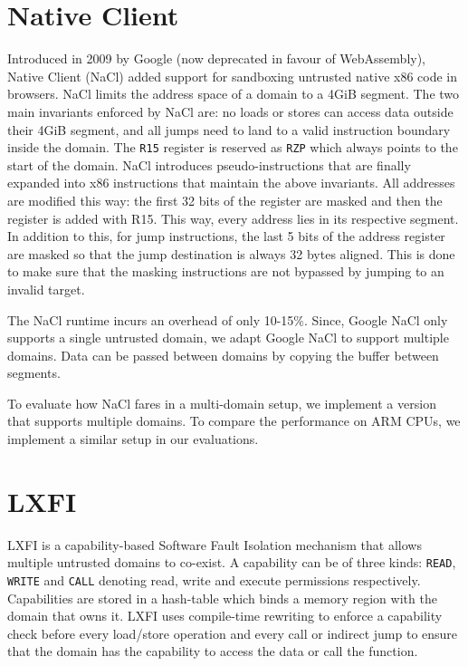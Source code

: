\section{Native Client}
Introduced in 2009 by Google (now deprecated in favour of WebAssembly), Native Client (NaCl) \cite{nacl} added support for sandboxing untrusted native x86 code in browsers. NaCl limits the address space of a domain to a 4GiB segment. The two main invariants enforced by NaCl are:  no loads or stores can access data outside their 4GiB segment, and all jumps need to land to a valid instruction boundary inside the domain. The \lstinline{R15} register is reserved as \lstinline{RZP} which always points to the start of the domain. NaCl introduces pseudo-instructions that are finally expanded into x86 instructions that maintain the above invariants. 
All addresses are modified this way: the first 32 bits of the register are masked and then the register is added with R15. This way, every address lies in its respective segment. In addition to this, for jump instructions, the last 5 bits of the address register are masked so that the jump destination is always 32 bytes aligned. This is done to make sure that the masking instructions are not bypassed by jumping to an invalid target. 

The NaCl runtime incurs an overhead of only 10-15\%. Since, Google NaCl only supports a single untrusted domain, we adapt Google NaCl to support multiple domains. Data can be passed between domains by copying the buffer between segments. 

To evaluate how NaCl fares in a multi-domain setup, we implement a version that supports multiple domains. To compare the performance on ARM CPUs, we implement a similar setup in our evaluations.

\section{LXFI}
LXFI\cite{lxfi} is a capability-based Software Fault Isolation mechanism that allows multiple untrusted domains to co-exist. A capability can be of three kinds: \lstinline{READ}, \lstinline{WRITE} and \lstinline{CALL} denoting read, write and execute permissions respectively. Capabilities are stored in a hash-table which binds a memory region with the domain that owns it. LXFI uses compile-time rewriting to enforce a capability check before every load/store operation and every call or indirect jump to ensure that the domain has the capability to access the data or call the function. 

